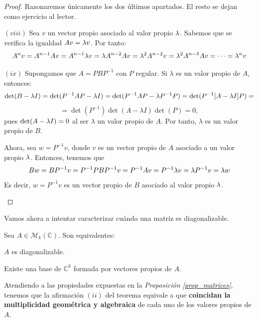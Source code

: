 \begin{proof} Razonaremos únicamente los dos últimos apartados. El resto se dejan como ejercicio al lector.

\begin{nlist}

\item[$(viii)$] Sea $v$ un vector propio asociado al valor propio $\lambda$. Sabemos que se verifica la igualdad $Av = \lambda v$. Por tanto: $$A^n v = A^{n-1}Av = A^{n-1}\lambda v = \lambda A^{n-2}Av = \lambda^2 A^{n-2}v = \lambda^2 A^{n-3}Av = \dots = \lambda^n v$$

\item[$(ix)$] Supongamos que $A=PBP^{-1}$ con $P$ regular. Si $\lambda$ es un valor propio de $A$, entonces: $$\det(B - \lambda I) =  \det(P^{-1}AP - \lambda I) = \det(P^{-1}AP - \lambda P^{-1}P) = \det(P^{-1}[A - \lambda I]P) =$$ $$=\det(P^{-1}) \det(A - \lambda I) \det(P) = 0, $$
pues $\det(A - \lambda I) = 0$ al ser $\lambda$ un valor propio de $A$. Por tanto, $\lambda$ es un valor propio de $B$.

Ahora, sea $w = P^{-1}v$, donde $v$ es un vector propio de $A$ asociado a un valor propio $\lambda$. Entonces, tenemos que $$Bw = BP^{-1}v = P^{-1}PBP^{-1}v = P^{-1}Av = P^{-1}\lambda v = \lambda P^{-1}v = \lambda w$$ Es decir, $w = P^{-1}v$ es un vector propio de $B$ asociado al valor propio $\lambda$.

\end{nlist}


\end{proof}

Vamos ahora a intentar caracterizar cuándo una matriz es diagonalizable.

\begin{nth}
  Sea $A \in \mathcal M_k(\mathbb C)$. Son equivalentes:
  \begin{nlist}
  \item $A$ es diagonalizable.
  \item Existe una base de $\mathbb C^k$ formada por vectores propios de $A$.
  \end{nlist}
\end{nth}

\begin{nota}
	Atendiendo a las propiedades expuestas en la \textit{Proposición \ref{prop_matrices}}, tenemos que la afirmación $(ii)$ del teorema equivale a que \textbf{coincidan la multiplicidad geométrica y algebraica} de cada uno de los valores propios de $A$.
\end{nota}

